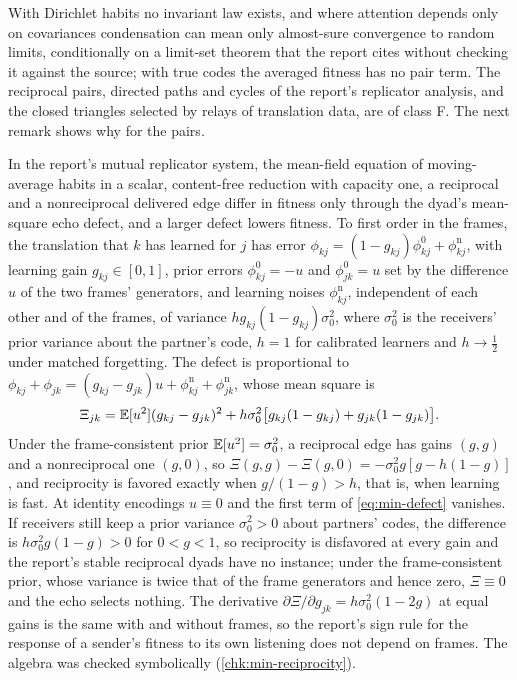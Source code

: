 With Dirichlet habits no invariant law exists, and where attention depends only on covariances condensation can mean only almost-sure convergence to random limits, conditionally on a limit-set theorem \citep{benaim1999dynamics} that the report cites without checking it against the source; with true codes the averaged fitness has no pair term. The reciprocal pairs, directed paths and cycles of the report's replicator analysis, and the closed triangles selected by relays of translation data, are of class F. The next remark shows why for the pairs.

\begin{remark}\label{rem:min-reciprocity}
In the report's mutual replicator system, the mean-field equation of moving-average habits in a scalar, content-free reduction with capacity one, a reciprocal and a nonreciprocal delivered edge differ in fitness only through the dyad's mean-square echo defect, and a larger defect lowers fitness. To first order in the frames, the translation that $k$ has learned for $j$ has error $\phi_{kj}=(1-g_{kj})\phi^0_{kj}+\phi^{\mathrm n}_{kj}$, with learning gain $g_{kj}\in[0,1]$, prior errors $\phi^0_{kj}=-u$ and $\phi^0_{jk}=u$ set by the difference $u$ of the two frames' generators, and learning noises $\phi^{\mathrm n}_{kj}$, independent of each other and of the frames, of variance $hg_{kj}(1-g_{kj})\sigma_0^2$, where $\sigma_0^2$ is the receivers' prior variance about the partner's code, $h=1$ for calibrated learners and $h\to\frac12$ under matched forgetting. The defect is proportional to $\phi_{kj}+\phi_{jk}=(g_{kj}-g_{jk})u+\phi^{\mathrm n}_{kj}+\phi^{\mathrm n}_{jk}$, whose mean square is
\begin{equation}\label{eq:min-defect}
\Xi_{jk}=\mathbb{E}[u^2](g_{kj}-g_{jk})^2+h\sigma_0^2\bigl[g_{kj}(1-g_{kj})+g_{jk}(1-g_{jk})\bigr].
\end{equation}
Under the frame-consistent prior $\mathbb{E}[u^2]=\sigma_0^2$, a reciprocal edge has gains $(g,g)$ and a nonreciprocal one $(g,0)$, so $\Xi(g,g)-\Xi(g,0)=-\sigma_0^2g[g-h(1-g)]$, and reciprocity is favored exactly when $g/(1-g)>h$, that is, when learning is fast. At identity encodings $u\equiv0$ and the first term of \eqref{eq:min-defect} vanishes. If receivers still keep a prior variance $\sigma_0^2>0$ about partners' codes, the difference is $h\sigma_0^2g(1-g)>0$ for $0<g<1$, so reciprocity is disfavored at every gain and the report's stable reciprocal dyads have no instance; under the frame-consistent prior, whose variance is twice that of the frame generators and hence zero, $\Xi\equiv0$ and the echo selects nothing. The derivative $\partial\Xi/\partial g_{jk}=h\sigma_0^2(1-2g)$ at equal gains is the same with and without frames, so the report's sign rule for the response of a sender's fitness to its own listening does not depend on frames. The algebra was checked symbolically (\cref{chk:min-reciprocity}).
\end{remark}

